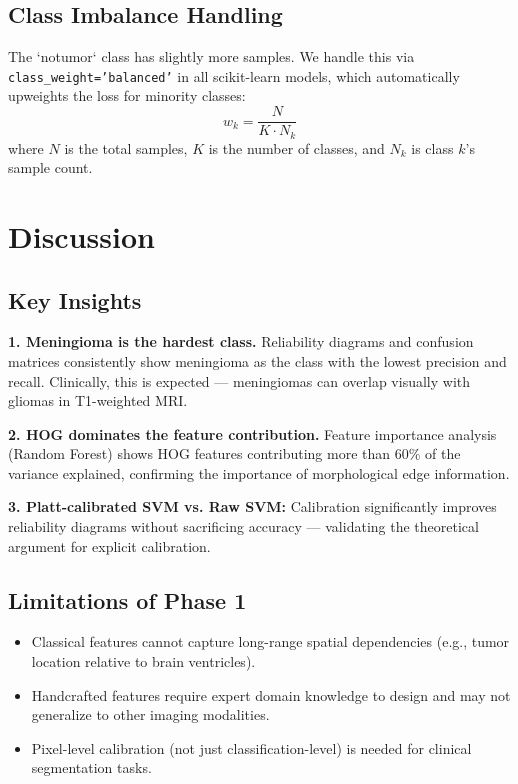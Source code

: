 \documentclass[12pt,a4paper]{article}
\begin{document}
\subsection{Class Imbalance Handling}

The `notumor` class has slightly more samples. We handle this via \texttt{class\_weight='balanced'} in all scikit-learn models, which automatically upweights the loss for minority classes:
\[
w_k = \frac{N}{K \cdot N_k}
\]
where $N$ is the total samples, $K$ is the number of classes, and $N_k$ is class $k$'s sample count.

\section{Discussion}

\subsection{Key Insights}

\textbf{1. Meningioma is the hardest class.} Reliability diagrams and confusion matrices consistently show meningioma as the class with the lowest precision and recall. Clinically, this is expected — meningiomas can overlap visually with gliomas in T1-weighted MRI.

\textbf{2. HOG dominates the feature contribution.} Feature importance analysis (Random Forest) shows HOG features contributing more than 60\% of the variance explained, confirming the importance of morphological edge information.

\textbf{3. Platt-calibrated SVM vs. Raw SVM:} Calibration significantly improves reliability diagrams without sacrificing accuracy — validating the theoretical argument for explicit calibration.

\subsection{Limitations of Phase 1}

\begin{itemize}[noitemsep]
    \item Classical features cannot capture long-range spatial dependencies (e.g., tumor location relative to brain ventricles).
    \item Handcrafted features require expert domain knowledge to design and may not generalize to other imaging modalities.
    \item Pixel-level calibration (not just classification-level) is needed for clinical segmentation tasks.
\end{itemize}
\end{document}
